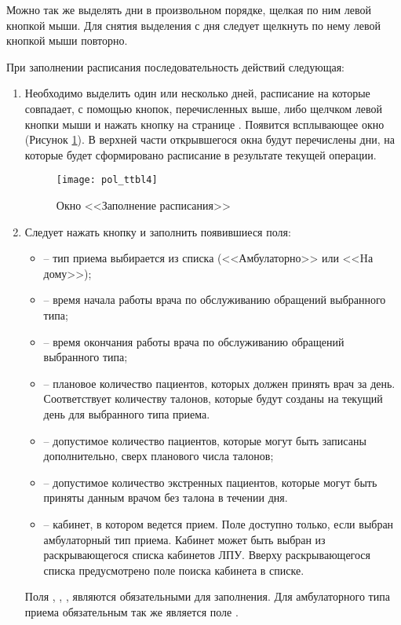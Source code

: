 {Можно так же выделять дни в произвольном порядке, щелкая по ним левой кнопкой мыши. Для снятия выделения с дня следует щелкнуть по нему левой кнопкой мыши повторно.


При заполнении расписания последовательность действий следующая: 
\begin{enumerate}
 \item \label{n2} Необходимо выделить один или несколько дней, расписание на которые совпадает, с помощью кнопок, перечисленных выше, либо щелчком левой кнопки мыши и нажать кнопку  на странице . Появится всплывающее окно  (Рисунок \ref{img_pol_ttbl4}). В верхней части открывшегося окна будут перечислены дни, на которые будет сформировано расписание в результате текущей операции. 

 \begin{figure}[ht]\centering
  \texttt{[image: pol\_ttbl4]}
  \caption{Окно <<Заполнение расписания>>}
  \label{img_pol_ttbl4}
 \end{figure}

 \item \label{n1} Следует нажать кнопку  и заполнить появившиеся поля:
 \begin{itemize}
  \item {} -- тип приема выбирается из списка (<<Амбулаторно>> или <<Hа дому>>);
  \item {} -- время начала работы врача по обслуживанию обращений выбранного типа;
  \item {} -- время окончания работы врача по обслуживанию обращений выбранного типа;
  \item {} -- плановое количество пациентов, которых должен принять врач за день. Соответствует количеству талонов, которые будут созданы на текущий день для выбранного типа приема. 
  \item {} -- допустимое количество пациентов, которые могут быть записаны дополнительно, сверх планового числа талонов;
  \item {} -- допустимое количество экстренных пациентов, которые могут быть приняты данным врачом без талона в течении дня.
  \item {} -- кабинет, в котором ведется прием. Поле доступно только, если выбран амбулаторный тип приема. Кабинет может быть выбран из раскрывающегося списка кабинетов ЛПУ. Вверху раскрывающегося списка предусмотрено поле поиска кабинета в списке.
 \end{itemize}
 Поля , , ,  являются обязательными для заполнения.  Для амбулаторного типа приема обязательным так же является поле .


\end{enumerate}}
